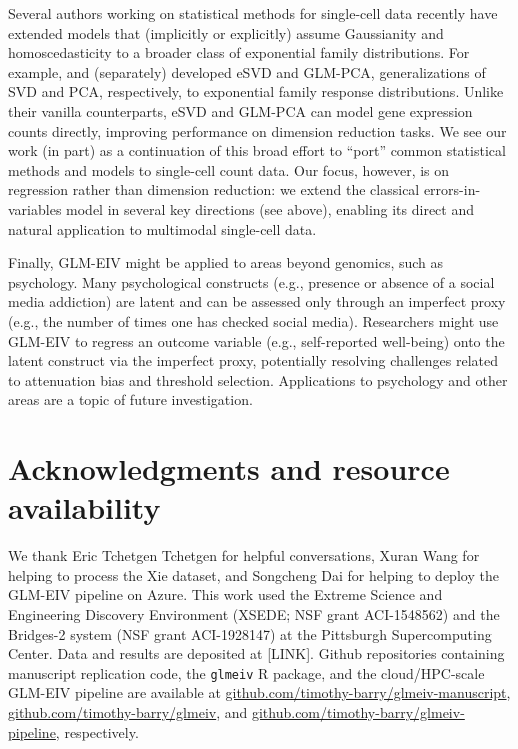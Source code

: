 \documentclass[12pt]{article}
\begin{document}
Several authors working on statistical methods for single-cell data recently have extended models that (implicitly or explicitly) assume Gaussianity and homoscedasticity to a broader class of exponential family distributions. For example, \parencite{Lin2021} and \parencite{Townes2019} (separately) developed eSVD and GLM-PCA, generalizations of SVD and PCA, respectively, to exponential family response distributions. Unlike their vanilla counterparts, eSVD and GLM-PCA can model gene expression counts directly, improving performance on dimension reduction tasks. We see our work (in part) as a continuation of this broad effort to ``port'' common statistical methods and models to single-cell count data. Our focus, however, is on regression rather than dimension reduction: we extend the classical errors-in-variables model in several key directions (see above), enabling its direct and natural application to multimodal single-cell data.

Finally, GLM-EIV might be applied to areas beyond genomics, such as psychology. Many psychological constructs (e.g., presence or absence of a social media addiction) are latent and can be assessed only through an imperfect proxy (e.g., the number of times one has checked social media). Researchers might use GLM-EIV to regress an outcome variable (e.g., self-reported well-being) onto the latent construct via the imperfect proxy, potentially resolving challenges related to attenuation bias and threshold selection. Applications to psychology and other areas are a topic of future investigation.

\section{Acknowledgments and resource availability}
We thank Eric Tchetgen Tchetgen for helpful conversations, Xuran Wang for helping to process the Xie dataset, and Songcheng Dai for helping to deploy the GLM-EIV pipeline on Azure. This work used the Extreme Science and Engineering Discovery Environment (XSEDE; NSF grant ACI-1548562) and the Bridges-2 system (NSF grant ACI-1928147) at the Pittsburgh Supercomputing Center. Data and results are deposited at [LINK]. Github repositories containing manuscript replication code, the \texttt{glmeiv} R package, and the cloud/HPC-scale GLM-EIV pipeline are available at \url{github.com/timothy-barry/glmeiv-manuscript}, \url{github.com/timothy-barry/glmeiv}, and \url{github.com/timothy-barry/glmeiv-pipeline}, respectively.
\end{document}
